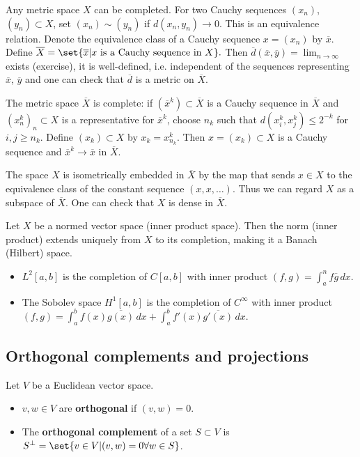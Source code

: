 \documentclass{article}
\begin{document}
\begin{remark}
    Any metric space $X$ can be completed.
    For two Cauchy sequences $(x_n)$, $(y_n) \subset X$, set $(x_n) \sim (y_n)$ if $d(x_n, y_n) \to 0$.
    This is an equivalence relation. Denote the equivalence class of a Cauchy sequence $x = (x_n)$ by $\overline{x}$.
    Define
    $\overline{X} = \set{\overline{x} | x \text{ is a Cauchy sequence in } X}.$
    Then $\overline{d}(\overline{x}, \overline{y}) = \lim_{n \to \infty}$ exists (exercise), it is well-defined, i.e. independent of the sequences representing $\overline{x}$, $\overline{y}$ and one can check that $\overline{d}$ is a metric on $\overline{X}$.

    The metric space $\overline{X}$ is complete: if $(\overline{x}^k) \subset \overline{X}$ is a Cauchy sequence in $\overline{X}$ and $(x^k_n)_n \subset X$ is a representative for $\overline{x}^k$, choose $n_k$ such that $d(x_i^k, x_j^k) \leq 2^{-k}$ for $i, j \geq n_k$.
    Define $(x_k) \subset X$ by $x_k = x_{n_k}^k$. Then $x = (x_k) \subset X$ is a Cauchy sequence and $\overline{x}^k \to \overline{x}$ in $\overline{X}$.

    The space $X$ is isometrically embedded in $\overline{X}$ by the map that sends $x \in X$ to the equivalence class of the constant sequence $(x, x, \dotsc)$.
    Thus we can regard $X$ as a subspace of $\overline{X}$.
    One can check that $X$ is dense in $\overline{X}$.
\end{remark}

\begin{ex}
    Let $X$ be a normed vector space (inner product space).
    Then the norm (inner product) extends uniquely from $X$ to its completion, making it a Banach (Hilbert) space.
\end{ex}

\begin{eg}
    \leavevmode
    \begin{itemize}
        \item $L^2[a,b]$ is the completion of $C[a, b]$ with inner product $(f,g) = \int_a^n f \overline{g} \, dx$.
        \item The Sobolev space $H^1[a,b]$ is the completion of $C^\infty$ with inner product $(f, g) = \int_a^b f(x) \overline{g(x)} \, dx + \int_a^b f'(x) \overline{g'(x)} \, dx$.
    \end{itemize}
\end{eg}

\subsection{Orthogonal complements and projections}
\begin{defi}
    Let $V$ be a Euclidean vector space.
    \begin{itemize}
        \item $v,w \in V$ are \textbf{orthogonal} if $(v, w) = 0$.
        \item The \textbf{orthogonal complement} of a set $S \subset V$ is $S^\perp = \set{v \in V | (v, w) = 0 \forall w \in S}$.
    \end{itemize}
\end{defi}
\end{document}
